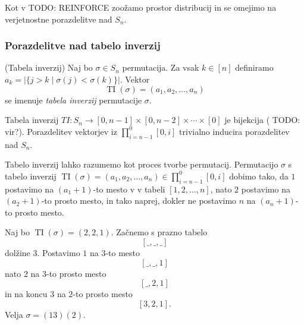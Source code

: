 \documentclass[mat2, tisk]{fmfdelo}
\newcommand{\TODO}[1]{{\color{blue} TODO: #1}}
\begin{document}
            Kot v \TODO{REINFORCE} zoožamo prostor distribucij in se
            omejimo na verjetnostne porazdelitve nad $S_n$.

            \subsubsection{Porazdelitve nad tabelo inverzij}
            \begin{definicija}(Tabela inverzij)
              Naj bo $\sigma \in S_n$ permutacija. Za vsak $k \in [n]$
              definiramo $a_k = |\{ j > k
                \mid \sigma(j) < \sigma(k)
              \}|$. Vektor
              $$\operatorname{TI}(\sigma) =
              (a_1,
                a_2, \dotsc,
              a_n)$$
              se
              imenuje \emph{tabela inverzij} permutacije $\sigma$.
            \end{definicija}
            Tabela inverzij $TI \colon S_n \to [0, n-1] \times [0,
            n-2 ] \times \dotsm \times [0]$
            je bijekcija (\TODO{vir?}). Porazdelitev vektorjev iz
            $\prod_{i=n-1}^0 [0, i]$ trivialno inducira porazdelitev nad $S_n$.

            Tabelo inverzij lahko razumemo kot proces tvorbe
            permutacij. Permutacijo $\sigma$ s tabelo inverzij
            $\operatorname{TI}(\sigma) = (a_1, a_2, \dotsc, a_n) \in
            \prod_{i=n-1}^0 [0, i]$ dobimo tako, da
            $1$ postavimo na $(a_1 +1 )$-to mesto v v tabeli $[1,2,\dotsc, n]$,
            nato $2$ postavimo na $(a_2 +1)$-to prosto mesto,
            in tako naprej, dokler ne postavimo $n$ na $(a_n +1)$-to
            prosto mesto.
            \begin{primer}
              \label{primer:tabela_inverzij}
              Naj bo  $\operatorname{TI}(\sigma) = (2, 2, 1)$.
              Začnemo s prazno tabelo
              $$[ \_, \_, \_]$$
              dolžine $3$. Postavimo $1$ na $3$-to mesto
              $$[ \_, \_, 1]$$
              nato $2$ na $3$-to prosto mesto
              $$[ \_, 2, 1]$$
              in na koncu $3$ na $2$-to prosto mesto
              $$[ 3, 2, 1].$$
              Velja $\sigma = (13)(2)$.
            \end{primer}
\end{document}

